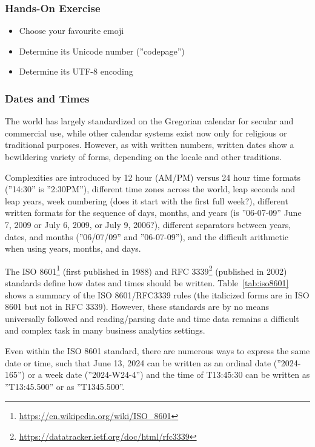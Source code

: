\begin{tcolorbox}[colback=code]
\subsubsection*{Hands-On Exercise}
\begin{itemize}
	\item Choose your favourite emoji
	\item Determine its Unicode number (''codepage'')
	\item Determine its UTF-8 encoding
\end{itemize}
\end{tcolorbox}

\subsubsection*{Dates and Times}

The world has largely standardized on the Gregorian calendar for secular and commercial use, while other calendar systems exist now only for religious or traditional purposes. However, as with written numbers, written dates show a bewildering variety of forms, depending on the locale and other traditions.

Complexities are introduced by 12 hour (AM/PM) versus 24 hour time formats (''14:30'' is ''2:30PM''), different time zones across the world, leap seconds and leap years, week numbering (does it start with the first full week?), different written formats for the sequence of days, months, and years (is ''06-07-09'' June 7, 2009 or July 6, 2009, or July 9, 2006?), different separators between years, dates, and months (''06/07/09'' and ''06-07-09''), and the difficult arithmetic when using years, months, and days. 

The ISO 8601\footnote{\url{https://en.wikipedia.org/wiki/ISO_8601}} (first published in 1988) and RFC 3339\footnote{\url{https://datatracker.ietf.org/doc/html/rfc3339}} (published in 2002) standards define how dates and times should be written. Table~\ref{tab:iso8601} shows a summary of the ISO 8601/RFC3339 rules (the italicized forms are in ISO 8601 but not in RFC 3339). However, these standards are by no means universally followed and reading/parsing date and time data remains a difficult and complex task in many business analytics settings. 

Even within the ISO 8601 standard, there are numerous ways to express the same date or time, such that June 13, 2024 can be written as an ordinal date (''2024-165'') or a week date (''2024-W24-4'') and the time of T13:45:30 can be written as ''T13:45.500'' or as ''T1345.500''. 


